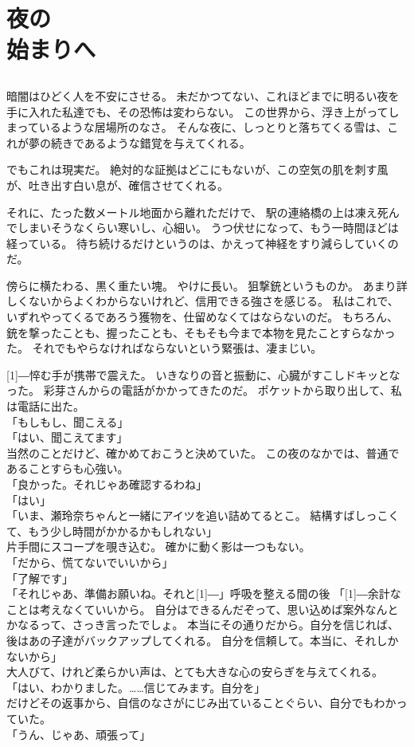 \documentclass[../IHMain]{subfiles}
\begin{document}
    

\chapter{夜の\\始まりへ}
\section{}
暗闇はひどく人を不安にさせる。
未だかつてない、これほどまでに明るい夜を手に入れた私達でも、その恐怖は変わらない。
この世界から、浮き上がってしまっているような居場所のなさ。
そんな夜に、しっとりと落ちてくる雪は、これが夢の続きであるような錯覚を与えてくれる。

でもこれは現実だ。
絶対的な証拠はどこにもないが、この空気の肌を刺す風が、吐き出す白い息が、確信させてくれる。

それに、たった数メートル地面から離れただけで、
駅の連絡橋の上は凍え死んでしまいそうなくらい寒いし、心細い。
うつ伏せになって、もう一時間ほどは経っている。
待ち続けるだけというのは、かえって神経をすり減らしていくのだ。

傍らに横たわる、黒く重たい塊。
やけに長い。
狙撃銃というものか。
あまり詳しくないからよくわからないけれど、信用できる強さを感じる。
私はこれで、いずれやってくるであろう獲物を、仕留めなくてはならないのだ。
もちろん、銃を撃ったことも、握ったことも、そもそも今まで本物を見たことすらなかった。
それでもやらなければならないという緊張は、凄まじい。

\scalebox{3}[1]{―}悴む手が携帯で震えた。
いきなりの音と振動に、心臓がすこしドキッとなった。
彩芽さんからの電話がかかってきたのだ。
ポケットから取り出して、私は電話に出た。\\
「もしもし、聞こえる」\\
「はい、聞こえてます」\\
当然のことだけど、確かめておこうと決めていた。
この夜のなかでは、普通であることすらも心強い。\\
「良かった。それじゃあ確認するわね」\\
「はい」\\
「いま、瀬玲奈ちゃんと一緒にアイツを追い詰めてるとこ。
結構すばしっこくて、もう少し時間がかかるかもしれない」\\
片手間にスコープを覗き込む。
確かに動く影は一つもない。\\
「だから、慌てないでいいから」\\
「了解です」\\
「それじゃあ、準備お願いね。それと\scalebox{3}[1]{―}」呼吸を整える間の後
「\scalebox{3}[1]{―}余計なことは考えなくていいから。
自分はできるんだぞって、思い込めば案外なんとかなるって、さっき言ったでしょ。
本当にその通りだから。自分を信じれば、後はあの子達がバックアップしてくれる。
自分を信頼して。本当に、それしかないから」\\
大人びて、けれど柔らかい声は、とても大きな心の安らぎを与えてくれる。\\
「はい、わかりました。……信じてみます。自分を」\\
だけどその返事から、自信のなさがにじみ出ていることぐらい、自分でもわかっていた。\\
「うん、じゃあ、頑張って」
\end{document}
